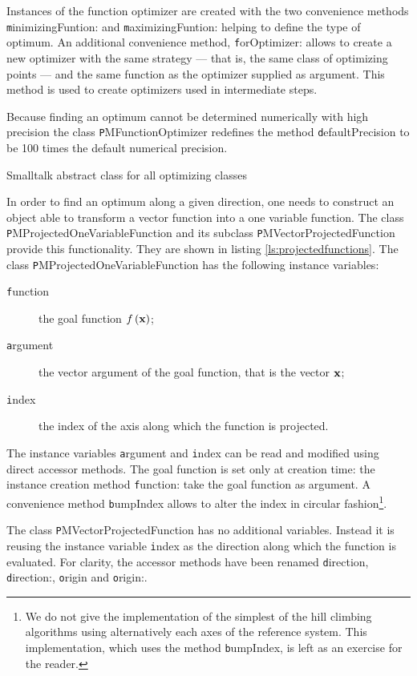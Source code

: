 Instances of the function optimizer are created with the two
convenience methods {\texttt minimizingFuntion:} and {\texttt
maximizingFuntion:} helping to define the type of optimum. An
additional convenience method, {\texttt forOptimizer:} allows to
create a new optimizer with the same strategy --- that is, the
same class of optimizing points --- and the same function as the
optimizer supplied as argument.
This method is used to create optimizers used in intermediate steps.

Because finding an optimum cannot be determined numerically with
high precision \cite{Press} the class {\texttt PMFunctionOptimizer}
redefines the method {\texttt defaultPrecision} to be 100 times the
default numerical precision.
\begin{listing} Smalltalk abstract class for all optimizing classes \label{ls:optimizerAbstract}

\end{listing}

In order to find an optimum along a given direction, one needs to
construct an object able to transform a vector function into a one
variable function.
The class {\texttt PMProjectedOneVariableFunction} and its subclass {\texttt
  PMVectorProjectedFunction} provide this functionality.
They are shown in listing \ref{ls:projectedfunctions}.
The class {\texttt PMProjectedOneVariableFunction} has the following instance
variables:
\begin{description}
  \item[\texttt function] the goal function $f\left({\textbf x}\right)$;
  \item[\texttt argument] the vector argument of the goal function,
  that is the vector ${\textbf x}$;
  \item[\texttt index] the index of the axis along which the function
  is projected.
\end{description}
The instance variables {\texttt argument} and {\texttt index} can be read
and modified using direct accessor methods.
The goal function is set only at creation time: the instance creation method {\texttt
function:} take the goal function as argument.
A convenience method {\texttt bumpIndex} allows to alter the index in circular
fashion\footnote{We do not give the implementation of the simplest
of the hill climbing algorithms using alternatively each axes of
the reference system. This implementation, which uses the method
{\texttt bumpIndex}, is left as an exercise for the reader.}.

The class {\texttt PMVectorProjectedFunction} has no additional
variables. Instead it is reusing the instance variable {\texttt index}
as the direction along which the function is evaluated. For
clarity, the accessor methods have been renamed {\texttt direction},
{\texttt direction:}, {\texttt origin} and {\texttt origin:}.

